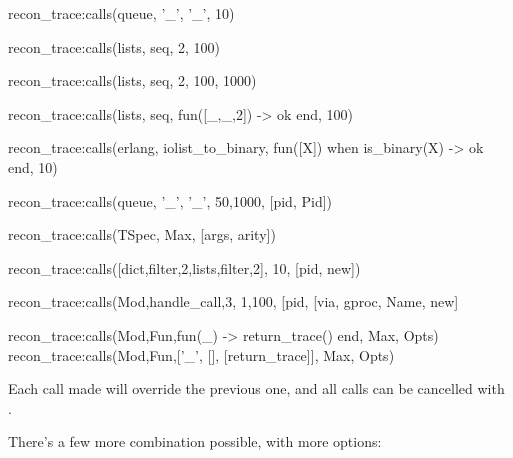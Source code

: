 \documentclass[11pt, oneside]{book}   	%
\begin{document}
\begin{VerbatimErl}
recon_trace:calls({queue, '_', '_'}, 10)

recon_trace:calls({lists, seq, 2}, 100)

recon_trace:calls({lists, seq, 2}, {100, 1000})

recon_trace:calls({lists, seq, fun([_,_,2]) -> ok end}, 100)

recon_trace:calls({erlang, iolist_to_binary,
                   fun([X]) when is_binary(X) -> ok end},
                  10)

recon_trace:calls({queue, '_', '_'}, {50,1000}, [{pid, Pid}])

recon_trace:calls(TSpec, Max, [{args, arity}])

recon_trace:calls([{dict,filter,2},{lists,filter,2}], 10, [{pid, new}])

recon_trace:calls({Mod,handle_call,3}, {1,100}, [{pid, [{via, gproc, Name}, new]}

recon_trace:calls({Mod,Fun,fun(_) -> return_trace() end}, Max, Opts)
recon_trace:calls({Mod,Fun,[{'_', [], [{return_trace}]}]}, Max, Opts)

\end{VerbatimErl}

Each call made will override the previous one, and all calls can be cancelled with .

There's a few more combination possible, with more options:
\end{document}
